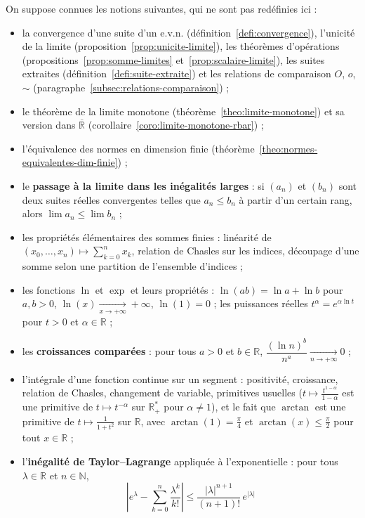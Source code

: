 On suppose connues les notions suivantes, qui ne sont pas redéfinies ici :
\begin{itemize}
\item la convergence d'une suite d'un e.v.n. (définition~\ref{defi:convergence}), l'unicité de la limite (proposition~\ref{prop:unicite-limite}), les théorèmes d'opérations (propositions~\ref{prop:somme-limites} et~\ref{prop:scalaire-limite}), les suites extraites (définition~\ref{defi:suite-extraite}) et les relations de comparaison $O$, $o$, $\sim$ (paragraphe~\ref{subsec:relations-comparaison}) ;
\item le théorème de la limite monotone (théorème~\ref{theo:limite-monotone}) et sa version dans $\overline{\mathbb{R}}$ (corollaire~\ref{coro:limite-monotone-rbar}) ;
\item l'équivalence des normes en dimension finie (théorème~\ref{theo:normes-equivalentes-dim-finie}) ;
\item le \textbf{passage à la limite dans les inégalités larges} : si $(a_n)$ et $(b_n)$ sont deux suites réelles convergentes telles que $a_n\leq b_n$ à partir d'un certain rang, alors $\lim a_n\leq\lim b_n$ ;
\item les propriétés élémentaires des sommes finies : linéarité de $(x_0,\dots,x_n)\mapsto\sum_{k=0}^n x_k$, relation de Chasles sur les indices, découpage d'une somme selon une partition de l'ensemble d'indices ;
\item les fonctions $\ln$ et $\exp$ et leurs propriétés : $\ln(ab)=\ln a+\ln b$ pour $a,b>0$, $\ln(x)\xrightarrow[x\to+\infty]{}+\infty$, $\ln(1)=0$ ; les puissances réelles $t^\alpha=e^{\alpha\ln t}$ pour $t>0$ et $\alpha\in\mathbb{R}$ ;
\item les \textbf{croissances comparées} : pour tous $a>0$ et $b\in\mathbb{R}$, $\dfrac{(\ln n)^b}{n^a}\xrightarrow[n\to+\infty]{}0$ ;
\item l'intégrale d'une fonction continue sur un segment : positivité, croissance, relation de Chasles, changement de variable, primitives usuelles ($t\mapsto\frac{t^{1-\alpha}}{1-\alpha}$ est une primitive de $t\mapsto t^{-\alpha}$ sur $\mathbb{R}_+^*$ pour $\alpha\neq 1$), et le fait que $\arctan$ est une primitive de $t\mapsto\frac{1}{1+t^2}$ sur $\mathbb{R}$, avec $\arctan(1)=\frac{\pi}{4}$ et $\arctan(x)\leq\frac{\pi}{2}$ pour tout $x\in\mathbb{R}$ ;
\item l'\textbf{inégalité de Taylor--Lagrange} appliquée à l'exponentielle : pour tous $\lambda\in\mathbb{R}$ et $n\in\mathbb{N}$,
\[\left|e^\lambda-\sum_{k=0}^{n}\frac{\lambda^k}{k!}\right| \leq \frac{|\lambda|^{n+1}}{(n+1)!}\,e^{|\lambda|}\]
\end{itemize}


